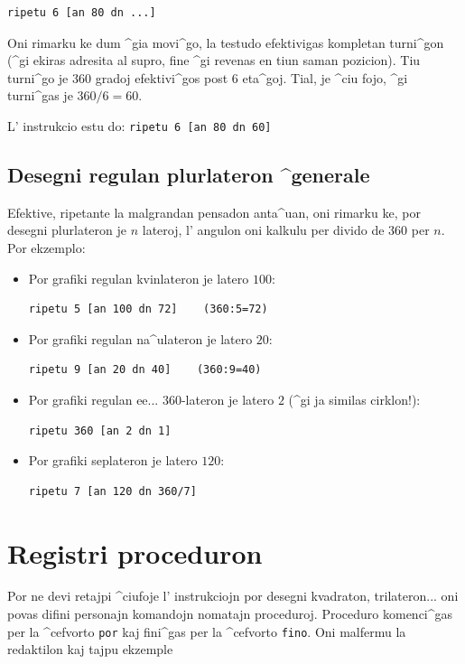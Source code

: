 \begin{verbatim}
ripetu 6 [an 80 dn ...]
\end{verbatim}

Oni rimarku ke dum ^gia movi^go, la testudo efektivigas kompletan
turni^gon (^gi ekiras adresita al supro, fine ^gi revenas en tiun
saman pozicion).  Tiu turni^go je 360 gradoj efektivi^gos post 6
eta^goj.  Tial, je ^ciu fojo, ^gi turni^gas je
${360} / {6}=60$\degre.

L' instrukcio estu do: \texttt{ripetu 6 [an 80 dn 60]}

\subsection{Desegni regulan plurlateron ^generale}
\noindent Efektive, ripetante la malgrandan pensadon anta^uan, oni
rimarku ke, por desegni plurlateron je $n$ lateroj, l' angulon oni
kalkulu per divido de $360$ per $n$.  Por ekzemplo:
\begin{itemize}
\item Por grafiki regulan kvinlateron je latero $100$:
\begin{verbatim}
ripetu 5 [an 100 dn 72]    (360:5=72)
\end{verbatim}
\item Por grafiki regulan na^ulateron je latero $20$:
\begin{verbatim}
ripetu 9 [an 20 dn 40]    (360:9=40)
\end{verbatim}
\item Por grafiki regulan ee... 360-lateron je latero $2$ (^gi ja
  similas cirklon!):
\begin{verbatim}
ripetu 360 [an 2 dn 1]  
\end{verbatim}
\item Por grafiki seplateron je latero $120$:
\begin{verbatim}
ripetu 7 [an 120 dn 360/7]
\end{verbatim}
\end{itemize}

\section{Registri proceduron}
\noindent Por ne devi retajpi ^ciufoje l' instrukciojn por desegni
kvadraton, trilateron... oni povas difini personajn komandojn nomatajn
\og proceduroj\fg.  Proceduro komenci^gas per la ^cefvorto
\texttt{por} kaj fini^gas per la ^cefvorto \texttt{fino}.  Oni
malfermu la redaktilon kaj tajpu ekzemple

